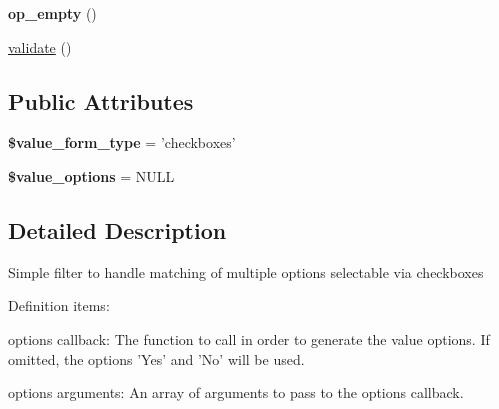 \begin{DoxyCompactItemize}
\item 
\hypertarget{classviews__handler__filter__in__operator_a4f78a652b66e9a364e3ff33338796732}{
{\bfseries op\_\-empty} ()}
\label{classviews__handler__filter__in__operator_a4f78a652b66e9a364e3ff33338796732}

\item 
\hyperlink{classviews__handler__filter__in__operator_a5d2cc4d0420cc3a8949e371c694230d3}{validate} ()
\end{DoxyCompactItemize}
\subsection*{Public Attributes}
\begin{DoxyCompactItemize}
\item 
\hypertarget{classviews__handler__filter__in__operator_a8541978637934d90d452a0cdfedca1ce}{
{\bfseries \$value\_\-form\_\-type} = 'checkboxes'}
\label{classviews__handler__filter__in__operator_a8541978637934d90d452a0cdfedca1ce}

\item 
\hypertarget{classviews__handler__filter__in__operator_a4169ae0cc3d3d7d25ab8b57a19ae6762}{
{\bfseries \$value\_\-options} = NULL}
\label{classviews__handler__filter__in__operator_a4169ae0cc3d3d7d25ab8b57a19ae6762}

\end{DoxyCompactItemize}


\subsection{Detailed Description}
Simple filter to handle matching of multiple options selectable via checkboxes

Definition items:
\begin{DoxyItemize}
\item options callback: The function to call in order to generate the value options. If omitted, the options 'Yes' and 'No' will be used.
\item options arguments: An array of arguments to pass to the options callback. 
\end{DoxyItemize}

